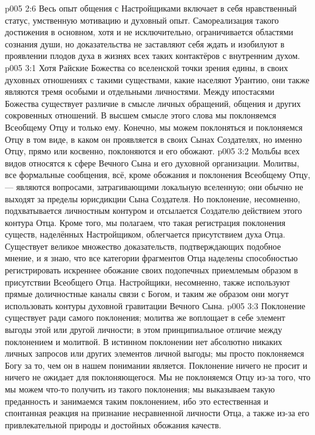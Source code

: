 \vs p005 2:6 Весь опыт общения с Настройщиками включает в себя нравственный статус, умственную мотивацию и духовный опыт. Самореализация такого достижения в основном, хотя и не исключительно, ограничивается областями сознания души, но доказательства не заставляют себя ждать и изобилуют в проявлении плодов духа в жизнях всех таких контактёров с внутренним духом.
\vs p005 3:1 Хотя Райские Божества со вселенской точки зрения едины, в своих духовных отношениях с такими существами, какие населяют Урантию, они также являются тремя особыми и отдельными личностями. Между ипостасями Божества существует различие в смысле личных обращений, общения и других сокровенных отношений. В высшем смысле этого слова мы поклоняемся Всеобщему Отцу и только ему. Конечно, мы можем поклоняться и поклоняемся Отцу в том виде, в каком он проявляется в своих Сынах Создателях, но именно Отцу, прямо или косвенно, поклоняются и его обожают.
\vs p005 3:2 Мольбы всех видов относятся к сфере Вечного Сына и его духовной организации. Молитвы, все формальные сообщения, всё, кроме обожания и поклонения Всеобщему Отцу, --- являются вопросами, затрагивающими локальную вселенную; они обычно не выходят за пределы юрисдикции Сына Создателя. Но поклонение, несомненно, подхватывается личностным контуром и отсылается Создателю действием этого контура Отца. Кроме того, мы полагаем, что такая регистрация поклонения существ, наделённых Настройщиком, облегчается присутствием духа Отца. Существует великое множество доказательств, подтверждающих подобное мнение, и я знаю, что все категории фрагментов Отца наделены способностью регистрировать искреннее обожание своих подопечных приемлемым образом в присутствии Всеобщего Отца. Настройщики, несомненно, также используют прямые доличностные каналы связи с Богом, и таким же образом они могут использовать контуры духовной гравитации Вечного Сына.
\vs p005 3:3 Поклонение существует ради самого поклонения; молитва же воплощает в себе элемент выгоды этой или другой личности; в этом принципиальное отличие между поклонением и молитвой. В истинном поклонении нет абсолютно никаких личных запросов или других элементов личной выгоды; мы просто поклоняемся Богу за то, чем он в нашем понимании является. Поклонение ничего не просит и ничего не ожидает для поклоняющегося. Мы не поклоняемся Отцу из\hyp{}за того, что мы можем что\hyp{}то получить из такого поклонения; мы выказываем такую преданность и занимаемся таким поклонением, ибо это естественная и спонтанная реакция на признание несравненной личности Отца, а также из\hyp{}за его привлекательной природы и достойных обожания качеств.
